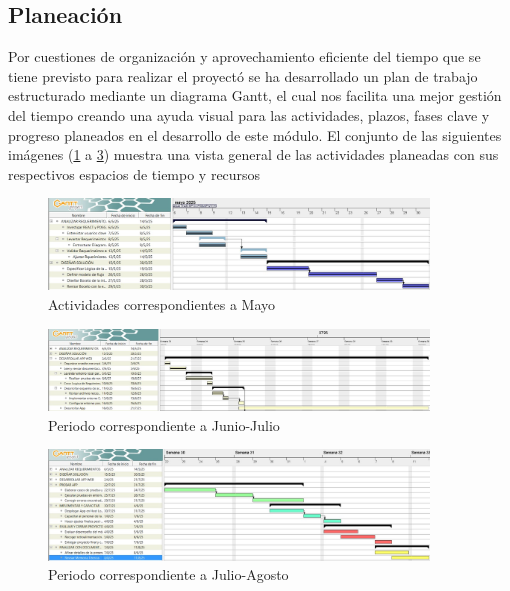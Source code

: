 \documentclass[12pt,letterpaper,spanish]{report}
\begin{document}
\subsection{Planeación}

Por cuestiones de organización y aprovechamiento eficiente del tiempo que se tiene previsto para realizar el proyectó se ha desarrollado un plan de trabajo estructurado mediante un diagrama Gantt, el cual nos facilita una mejor gestión del tiempo creando una ayuda visual para las actividades, plazos, fases clave y progreso planeados en el desarrollo de este módulo. El conjunto de las siguientes imágenes (\ref{a03} a \ref{a05}) muestra una vista general de las actividades planeadas con sus respectivos espacios de tiempo y recursos

\begin{figure}[htp]
  \centering
  \includegraphics[width=0.9\textwidth]{Gantt_Mayo_30.jpg}
  \caption{Actividades correspondientes a Mayo}\label{a03}
\end{figure}

\begin{figure}[htp]
  \centering
  \includegraphics[width=0.9\textwidth]{Gantt_Week_23_30.jpg}
  \caption{Periodo correspondiente a Junio-Julio}\label{a04}
\end{figure}

\begin{figure}[htp]
  \centering
  \includegraphics[width=0.9\textwidth]{Gantt_Week_30_32.jpg}
  \caption{Periodo correspondiente a Julio-Agosto}\label{a05}
\end{figure}
\end{document}
